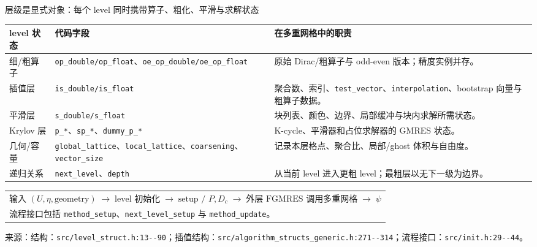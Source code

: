 \documentclass[UTF8,aspectratio=169,11pt]{ctexbeamer}
\newcommand{\source}[1]{%
  \vspace{0.06em}\par{\raggedright\scriptsize\color{muted}来源：#1\par}}
\newcommand{\code}[1]{\nolinkurl{#1}}
\newcommand{\denseframe}{%
  \footnotesize
  \setlength{\tabcolsep}{2.5pt}%
  \renewcommand{\arraystretch}{0.76}%
}
\begin{document}
\begin{frame}[t]{层级是显式对象：每个 level 同时携带算子、粗化、平滑与求解状态}
  \denseframe
  \scriptsize
  \begin{tabularx}{0.96\textwidth}{@{}p{}p{}Y@{}}
    \toprule
    level 状态 & 代码字段 & 在多重网格中的职责 \\
    \midrule
    细/粗算子 & \code{op_double/op_float}、\code{oe_op_double/oe_op_float} & 原始 Dirac/粗算子与 odd-even 版本；精度实例并存。 \\
    插值层 & \code{is_double/is_float} & 聚合数、索引、\code{test_vector}、\code{interpolation}、bootstrap 向量与粗算子数据。 \\
    平滑层 & \code{s_double/s_float} & 块列表、颜色、边界、局部缓冲与块内求解所需状态。 \\
    Krylov 层 & \code{p_*}、\code{sp_*}、\code{dummy_p_*} & K-cycle、平滑器和占位求解器的 GMRES 状态。 \\
    几何/容量 & \code{global_lattice}、\code{local_lattice}、\code{coarsening}、\code{vector_size} & 记录本层格点、聚合比、局部/ghost 体积与自由度。 \\
    递归关系 & \code{next_level}、\code{depth} & 从当前 level 进入更粗 level；最粗层以无下一级为边界。 \\
    \bottomrule
  \end{tabularx}
  \vspace{0.12cm}
  \begin{tabular}{@{}l@{}}
    $\text{输入 }(U,\eta,\text{geometry})
      \;\longrightarrow\;\text{level 初始化}
      \;\longrightarrow\;\text{setup / }P,D_c
      \;\longrightarrow\;\text{外层 FGMRES 调用多重网格}
      \;\longrightarrow\;\psi$ \\
    \quad 流程接口包括 \code{method_setup}、\code{next_level_setup} 与 \code{method_update}。
  \end{tabular}
  \source{结构：\code{src/level_struct.h:13--90}；插值结构：\code{src/algorithm_structs_generic.h:271--314}；流程接口：\code{src/init.h:29--44}。}
\end{frame}
\end{document}
